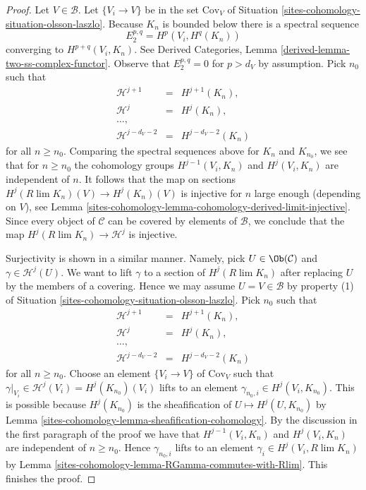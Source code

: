 \begin{proof}
Let $V \in \mathcal{B}$. Let $\{V_i \to V\}$ be in the set
$\text{Cov}_V$ of Situation \ref{sites-cohomology-situation-olsson-laszlo}.
Because $K_n$ is bounded below there is a spectral sequence
$$
E_2^{p, q} = H^p(V_i, H^q(K_n))
$$
converging to $H^{p + q}(V_i, K_n)$. See
Derived Categories, Lemma \ref{derived-lemma-two-ss-complex-functor}.
Observe that $E_2^{p, q} = 0$
for $p > d_V$ by assumption. Pick $n_0$ such that
$$
\begin{matrix}
\mathcal{H}^{j + 1} & = & H^{j + 1}(K_n), \\
\mathcal{H}^j & = & H^j(K_n), \\
\ldots, \\
\mathcal{H}^{j - d_V - 2} & = & H^{j - d_V - 2}(K_n)
\end{matrix}
$$
for all $n \geq n_0$. Comparing the spectral sequences above
for $K_n$ and $K_{n_0}$, we see that for $n \geq n_0$ the
cohomology groups $H^{j - 1}(V_i, K_n)$ and $H^j(V_i, K_n)$
are independent of $n$. It follows that the map on sections
$H^j(R\lim K_n)(V) \to H^j(K_n)(V)$ is injective for $n$ large
enough (depending on $V$), see
Lemma \ref{sites-cohomology-lemma-cohomology-derived-limit-injective}.
Since every object of $\mathcal{C}$ can be covered by elements
of $\mathcal{B}$, we conclude that the map
$H^j(R\lim K_n) \to \mathcal{H}^j$ is injective.

\medskip\noindent
Surjectivity is shown in a similar manner. Namely, pick
$U \in \Ob(\mathcal{C})$ and $\gamma \in \mathcal{H}^j(U)$.
We want to lift $\gamma$ to a section of $H^j(R\lim K_n)$
after replacing $U$ by the members of a covering. Hence we may
assume $U = V \in \mathcal{B}$ by property (1) of
Situation \ref{sites-cohomology-situation-olsson-laszlo}.
Pick $n_0$ such that
$$
\begin{matrix}
\mathcal{H}^{j + 1} & = & H^{j + 1}(K_n), \\
\mathcal{H}^j & = & H^j(K_n), \\
\ldots, \\
\mathcal{H}^{j - d_V - 2} & = & H^{j - d_V - 2}(K_n)
\end{matrix}
$$
for all $n \geq n_0$. Choose an element $\{V_i \to V\}$ of
$\text{Cov}_V$ such that
$\gamma|_{V_i} \in \mathcal{H}^j(V_i) = H^j(K_{n_0})(V_i)$
lifts to an element $\gamma_{n_0, i} \in H^j(V_i, K_{n_0})$.
This is possible because $H^j(K_{n_0})$ is the sheafification
of $U \mapsto H^j(U, K_{n_0})$ by Lemma \ref{sites-cohomology-lemma-sheafification-cohomology}.
By the discussion in the first paragraph of the proof we have that
$H^{j - 1}(V_i, K_n)$ and $H^j(V_i, K_n)$
are independent of $n \geq n_0$. Hence
$\gamma_{n_0, i}$ lifts to an element
$\gamma_i \in H^j(V_i, R\lim K_n)$ by
Lemma \ref{sites-cohomology-lemma-RGamma-commutes-with-Rlim}.
This finishes the proof.
\end{proof}

